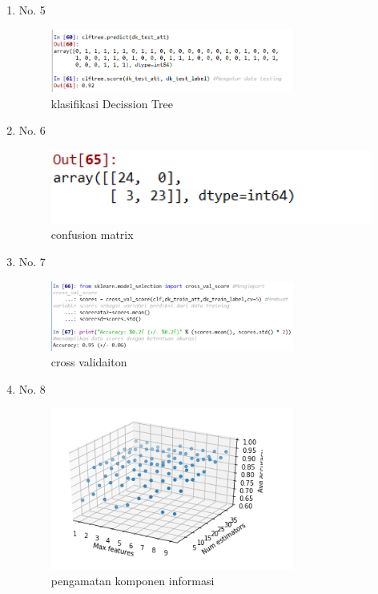 \begin{enumerate}
\item No. 5
	\hfill\\
	
\begin{figure}[H]
    \includegraphics[width=8cm]{figures/1174084/4/5.png}
    \centering
    \caption{klasiﬁkasi Decission Tree}
\end{figure}

\item No. 6
	\hfill\\
	
\begin{figure}[H]
    \includegraphics[width=12cm]{figures/1174084/4/6.png}
    \centering
    \caption{confusion matrix}
\end{figure}

\item No. 7
	\hfill\\
	
\begin{figure}[H]
    \includegraphics[width=8cm]{figures/1174084/4/7.png}
    \centering
    \caption{cross validaiton}
\end{figure}

\item No. 8
	\hfill\\
	
\begin{figure}[H]
    \includegraphics[width=8cm]{figures/1174084/4/8.png}
    \centering
    \caption{pengamatan komponen informasi}
\end{figure}


\end{enumerate}
